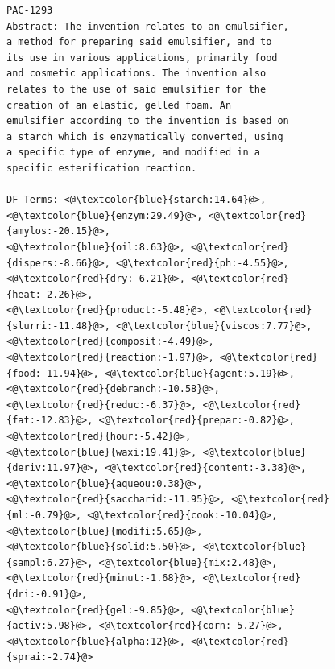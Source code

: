\begin{figure}[htpb]
\begin{framed}
\vspace*{-2ex}
  \centering
 \begin{lstlisting}[basicstyle=\scriptsize\ttfamily , linewidth=\columnwidth,breaklines=true] 
PAC-1293
Abstract: The invention relates to an emulsifier, 
a method for preparing said emulsifier, and to 
its use in various applications, primarily food 
and cosmetic applications. The invention also 
relates to the use of said emulsifier for the 
creation of an elastic, gelled foam. An 
emulsifier according to the invention is based on 
a starch which is enzymatically converted, using 
a specific type of enzyme, and modified in a 
specific esterification reaction.

DF Terms: <@\textcolor{blue}{starch:14.64}@>, <@\textcolor{blue}{enzym:29.49}@>, <@\textcolor{red}{amylos:-20.15}@>, 
<@\textcolor{blue}{oil:8.63}@>, <@\textcolor{red}{dispers:-8.66}@>, <@\textcolor{red}{ph:-4.55}@>, <@\textcolor{red}{dry:-6.21}@>, <@\textcolor{red}{heat:-2.26}@>, 
<@\textcolor{red}{product:-5.48}@>, <@\textcolor{red}{slurri:-11.48}@>, <@\textcolor{blue}{viscos:7.77}@>, <@\textcolor{red}{composit:-4.49}@>, 
<@\textcolor{red}{reaction:-1.97}@>, <@\textcolor{red}{food:-11.94}@>, <@\textcolor{blue}{agent:5.19}@>, <@\textcolor{red}{debranch:-10.58}@>, 
<@\textcolor{red}{reduc:-6.37}@>, <@\textcolor{red}{fat:-12.83}@>, <@\textcolor{red}{prepar:-0.82}@>, <@\textcolor{red}{hour:-5.42}@>, 
<@\textcolor{blue}{waxi:19.41}@>, <@\textcolor{blue}{deriv:11.97}@>, <@\textcolor{red}{content:-3.38}@>, <@\textcolor{blue}{aqueou:0.38}@>, 
<@\textcolor{red}{saccharid:-11.95}@>, <@\textcolor{red}{ml:-0.79}@>, <@\textcolor{red}{cook:-10.04}@>, <@\textcolor{blue}{modifi:5.65}@>, 
<@\textcolor{blue}{solid:5.50}@>, <@\textcolor{blue}{sampl:6.27}@>, <@\textcolor{blue}{mix:2.48}@>, <@\textcolor{red}{minut:-1.68}@>, <@\textcolor{red}{dri:-0.91}@>, 
<@\textcolor{red}{gel:-9.85}@>, <@\textcolor{blue}{activ:5.98}@>, <@\textcolor{red}{corn:-5.27}@>, <@\textcolor{blue}{alpha:12}@>, <@\textcolor{red}{sprai:-2.74}@> 


\end{lstlisting}
\end{framed}
\end{figure}
